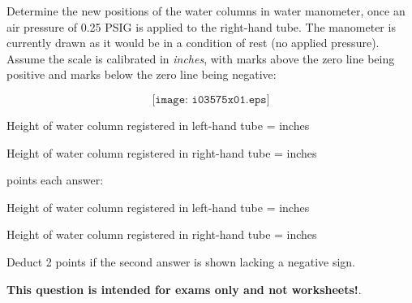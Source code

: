

Determine the new positions of the water columns in water manometer, once an air pressure of 0.25 PSIG is applied to the right-hand tube.  The manometer is currently drawn as it would be in a condition of rest (no applied pressure).  Assume the scale is calibrated in {\it inches}, with marks above the zero line being positive and marks below the zero line being negative:

$$\texttt{[image: i03575x01.eps]}$$

Height of water column registered in left-hand tube = \underbar{\hskip 50pt} inches

\vskip 10pt

Height of water column registered in right-hand tube = \underbar{\hskip 50pt} inches







 points each answer:

\vskip 10pt

Height of water column registered in left-hand tube =  inches

\vskip 10pt

Height of water column registered in right-hand tube =  inches

\vskip 10pt

Deduct 2 points if the second answer is shown lacking a negative sign.







{\bf This question is intended for exams only and not worksheets!}.



